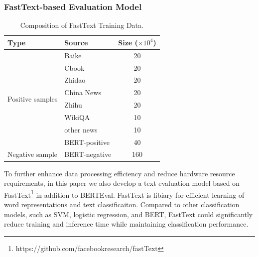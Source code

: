 \documentclass{article}
\newcommand\xrowht[2][0]{\addstackgap[.5\dimexpr#2\relax]{\vphantom{#1}}}
\begin{document}

\subsubsection{FastText-based Evaluation Model}

\begin{table}[htbp]
	\caption{Composition of FastText Training Data.}\label{fasttext_data}
	\centering
	\begin{tabular}{llc}
		\toprule
		Type     & Source     & Size ($\times 10^4 $) \\
		\midrule
		\multirow{8}{*}{Positive samples}   & Baike & 20 \\ 
                                            & Cbook & 20 \\
                                    		& Zhidao& 20  \\
		                                    & China News & 20 \\
	                                        & Zhihu & 20 \\
	                                        & WikiQA & 10 \\
	                                        & other news & 10 \\
	                                        & BERT-positive & 40 \\
	    \midrule
            \xrowht[()]{10pt}
		Negative sample & BERT-negative & 160 \\
		\bottomrule
	\end{tabular}
\end{table}

To further enhance data processing efficiency and reduce hardware resource requirements, in this paper we also develop a text evaluation model based on FastText\footnote{https://github.com/facebookresearch/fastText} in addition to BERTEval. FastText is libiary for efficient learning of word representations and text classificaiton. Compared to other classification models, such as SVM, logistic regression, and BERT, FastText could significantly reduce training and inference time while maintaining classification performance. 
\end{document}
